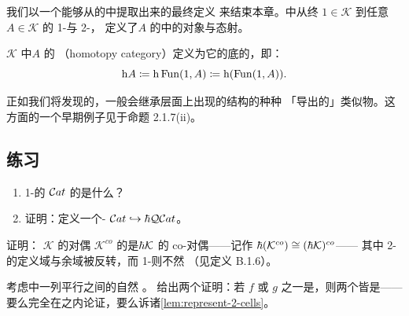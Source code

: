 我们以一个能够从\trInfinityCosmos{}的\trHomotopyTwoCategory{}中提取出来的最终定义
来结束本章。\trHomotopyTwoCategory{}中从终\trInfinityCategory{} $1\in\mathcal{K}$
到任意\trInfinityCategory $A\in\mathcal{K}$ 的 1-\trCell{}与 2-\trCell{}，
定义了\trInfinityCategory $A$ 的\trHomotopyCategory{}中的对象与态射。

\begin{definition}\label{def:homotopy-category-infinity-category}
\trInfinityCosmos{} $\mathcal{K}$ 中\trInfinityCategory $A$ 的%
\textbf{\trHomotopyCategory}（homotopy category）定义为它的底\trQuasiCategory{}的\trHomotopyCategory{}，即：
\begin{equation*}
\mathrm{h}A\coloneqq\mathrm{h}\operatorname{Fun}(1,A)\coloneqq\mathrm{h}(\operatorname{Fun}(1,A)).
\end{equation*}
\end{definition}

正如我们将发现的，\trHomotopyCategory{}一般会继承\trInfinityCategory{}层面上出现的结构的种种
「导出的」类似物。这方面的一个早期例子见于命题 2.1.7(ii)。

\subsection*{练习}

\begin{exercise}\label{ex:homotopy-2cat-of-cat}
\begin{enumerate}[label=(\roman*)]
\item 1-\trCategory{}的\trInfinityCosmos{} $\mathcal{C}at$ 的\trHomotopyTwoCategory{}是什么？
\item 证明：\trNerve{}定义一个-\trFunctor
  $\mathcal{C}at\hookrightarrow\hbar \mathcal{Q}\mathcal{C}at$。
\end{enumerate}
\end{exercise}

\begin{exercise}\label{ex:dual-cosmos-homotopy-2cat}
证明：\trInfinityCosmos{} $\mathcal{K}$ 的对偶\trInfinityCosmos{}
$\mathcal{K}^{co}$ 的\trHomotopyTwoCategory{}是\trHomotopyTwoCategory $\hbar \mathcal{K}$ 的
co-对偶——记作 $\hbar (\mathcal{K}^{co})\cong(\hbar \mathcal{K})^{co}$——
其中 2-\trCell{}的定义域与余域被反转，而 1-\trCell{}则不然
（见定义 B.1.6）。%
\end{exercise}

\begin{exercise}\label{ex:natural-isomorphism-equivalences}
考虑\trInfinityCosmos{}中一列平行\trFunctor{}之间的自然\trIsomorphism
{}。
给出两个证明：若 $f$ 或 $g$ 之一是\trEquivalence{}，则两个\trFunctor{}皆是——
要么完全在\trHomotopyTwoCategory{}之内论证，要么诉诸\cref{lem:represent-2-cells}。
\end{exercise}

